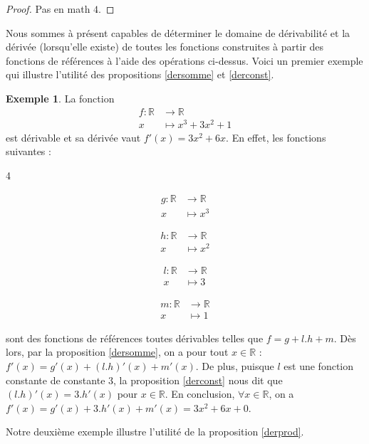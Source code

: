 \documentclass[a4paper,fontsize=13pt]{scrreprt}
\theoremstyle{plain}
\theoremstyle{definition}
\newtheorem{exe}[subsection]{Exemple}
\newcommand{\rr}{\mathbb{R}}
\begin{document}
\begin{proof}
	Pas en math $4$.
\end{proof}
Nous sommes à présent capables de déterminer le domaine de dérivabilité et la dérivée (lorsqu'elle existe) de toutes les fonctions construites à partir des fonctions de références à l'aide des opérations ci-dessus. Voici un premier exemple qui illustre l'utilité des propositions \ref{dersomme} et \ref{derconst}.
\begin{exe}
	La fonction
	\begin{align*}
	f  : \rr &\to \rr \\
	x &\mapsto x^3 + 3x^2 + 1
	\end{align*}
	est dérivable et sa dérivée vaut $f'(x)=3x^2+6x$. En effet, les fonctions suivantes :
	\begin{itemize}
	\end{itemize}
sont des fonctions de références toutes dérivables telles que $f = g + l.h + m$. Dès lors, par la proposition \ref{dersomme}, on a pour tout $x \in \rr$ : $f'(x)=g'(x)+(l.h)'(x)+m'(x)$. De plus, puisque $l$ est une fonction constante de constante $3$, la proposition \ref{derconst} nous dit que $(l.h)'(x)=3.h'(x)$ pour $x \in \rr$. En conclusion, $\forall x \in \rr$, on a $f'(x)=g'(x)+3.h'(x)+m'(x)=3x^2+6x+0$.
\end{exe}
Notre deuxième exemple illustre l'utilité de la proposition \ref{derprod}.
\end{document}
